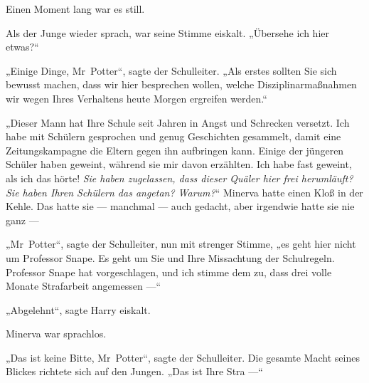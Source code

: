 Einen Moment lang war es still.

Als der Junge wieder sprach, war seine Stimme eiskalt. „Übersehe ich hier etwas?“

„Einige Dinge, Mr~Potter“, sagte der Schulleiter.
„Als erstes sollten Sie sich bewusst machen, dass wir hier besprechen wollen, welche Disziplinarmaßnahmen wir wegen Ihres Verhaltens heute Morgen ergreifen werden.“

„Dieser Mann hat Ihre Schule seit Jahren in Angst und Schrecken versetzt. Ich habe mit Schülern gesprochen und genug Geschichten gesammelt, damit eine Zeitungskampagne die Eltern gegen ihn aufbringen kann. Einige der jüngeren Schüler haben geweint, während sie mir davon erzählten. Ich habe fast geweint, als ich das hörte! \emph{Sie haben zugelassen, dass dieser Quäler hier frei herumläuft? Sie haben Ihren Schülern das angetan? Warum?}“
Minerva hatte einen Kloß in der Kehle. Das hatte sie — manchmal — auch gedacht, aber irgendwie hatte sie nie ganz —

„Mr~Potter“, sagte der Schulleiter, nun mit strenger Stimme, „es geht hier nicht um Professor Snape. Es geht um Sie und Ihre Missachtung der Schulregeln. Professor Snape hat vorgeschlagen, und ich stimme dem zu, dass drei volle Monate Strafarbeit angemessen —“

„Abgelehnt“, sagte Harry eiskalt.

Minerva war sprachlos.

„Das ist keine Bitte, Mr~Potter“, sagte der Schulleiter. Die gesamte Macht seines Blickes richtete sich auf den Jungen.
„Das ist Ihre Stra —“

